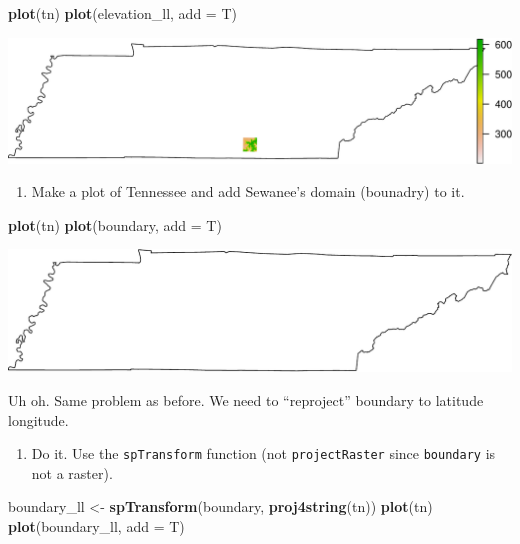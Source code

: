 \documentclass[
]{book}
\newenvironment{Shaded}{\begin{snugshade}}{\end{snugshade}}
\newcommand{\DataTypeTok}[1]{\textcolor[rgb]{0.13,0.29,0.53}{#1}}
\newcommand{\KeywordTok}[1]{\textcolor[rgb]{0.13,0.29,0.53}{\textbf{#1}}}
\newcommand{\NormalTok}[1]{#1}
\newcommand{\StringTok}[1]{\textcolor[rgb]{0.31,0.60,0.02}{#1}}
\providecommand{\tightlist}{%
  \setlength{\itemsep}{0pt}\setlength{\parskip}{0pt}}
\begin{document}
\begin{Shaded}
\begin{Highlighting}[]
\KeywordTok{plot}\NormalTok{(tn)}
\KeywordTok{plot}\NormalTok{(elevation_ll, }\DataTypeTok{add =}\NormalTok{ T)}
\end{Highlighting}
\end{Shaded}

\includegraphics{figures/unnamed-chunk-564-1.pdf}

\begin{enumerate}
\def\labelenumi{\arabic{enumi}.}
\setcounter{enumi}{19}
\tightlist
\item
  Make a plot of Tennessee and add Sewanee's domain (bounadry) to it.
\end{enumerate}

\begin{Shaded}
\begin{Highlighting}[]
\KeywordTok{plot}\NormalTok{(tn)}
\KeywordTok{plot}\NormalTok{(boundary, }\DataTypeTok{add =}\NormalTok{ T)}
\end{Highlighting}
\end{Shaded}

\includegraphics{figures/unnamed-chunk-565-1.pdf}

Uh oh. Same problem as before. We need to ``reproject'' boundary to latitude longitude.

\begin{enumerate}
\def\labelenumi{\arabic{enumi}.}
\setcounter{enumi}{20}
\tightlist
\item
  Do it. Use the \texttt{spTransform} function (not \texttt{projectRaster} since \texttt{boundary} is not a raster).
\end{enumerate}

\begin{Shaded}
\begin{Highlighting}[]
\NormalTok{boundary_ll <-}\StringTok{ }\KeywordTok{spTransform}\NormalTok{(boundary, }\KeywordTok{proj4string}\NormalTok{(tn))}
\KeywordTok{plot}\NormalTok{(tn)}
\KeywordTok{plot}\NormalTok{(boundary_ll, }\DataTypeTok{add =}\NormalTok{ T)}
\end{Highlighting}
\end{Shaded}
\end{document}
